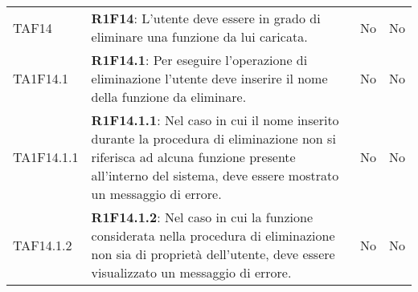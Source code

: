 \begin{longtable}{
		>{\centering}p{} 
		>{}p{}
		>{\centering}p{}
		>{\centering}p{} }
	TAF14 		& \textbf{R1F14}: L'utente deve essere in grado di eliminare una funzione da lui caricata. 																								& No & No \tabularnewline
	TA1F14.1 	& \textbf{R1F14.1}: Per eseguire l'operazione di eliminazione l'utente deve inserire il nome della funzione da eliminare. 																	& No & No \tabularnewline
	TA1F14.1.1 	& \textbf{R1F14.1.1}: Nel caso in cui il nome inserito durante la procedura di eliminazione non si riferisca ad alcuna funzione presente all'interno del sistema, deve essere mostrato un messaggio di errore.	& No & No \tabularnewline
	TAF14.1.2 	& \textbf{R1F14.1.2}: Nel caso in cui la funzione considerata nella procedura di eliminazione non sia di proprietà dell'utente, deve essere visualizzato un messaggio di errore.				& No & No \tabularnewline

\end{longtable}
